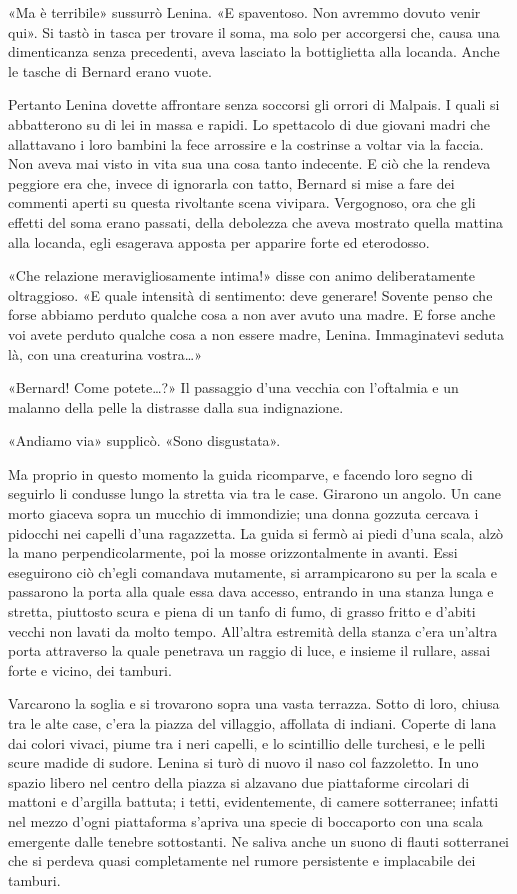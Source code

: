 \documentclass[
a5paper, %
10pt, %
twoside, 
onecolumn, %
openany, %
]{memoir}
\begin{document}
«Ma è terribile» sussurrò Lenina. «E spaventoso. Non avremmo dovuto venir qui». Si tastò in tasca per trovare il soma, ma solo per accorgersi che, causa una dimenticanza senza precedenti, aveva lasciato la bottiglietta alla locanda. Anche le tasche di Bernard erano vuote.

Pertanto Lenina dovette affrontare senza soccorsi gli orrori di Malpais. I quali si abbatterono su di lei in massa e rapidi. Lo spettacolo di due giovani madri che allattavano i loro bambini la fece arrossire e la costrinse a voltar via la faccia. Non aveva mai visto in vita sua una cosa tanto indecente. E ciò che la rendeva peggiore era che, invece di ignorarla con tatto, Bernard si mise a fare dei commenti aperti su questa rivoltante scena vivipara. Vergognoso, ora che gli effetti del soma erano passati, della debolezza che aveva mostrato quella mattina alla locanda, egli esagerava apposta per apparire forte ed eterodosso.

«Che relazione meravigliosamente intima!» disse con animo deliberatamente oltraggioso. «E quale intensità di sentimento: deve generare! Sovente penso che forse abbiamo perduto qualche cosa a non aver avuto una madre. E forse anche voi avete perduto qualche cosa a non essere madre, Lenina. Immaginatevi seduta là, con una creaturina vostra…»

«Bernard! Come potete…?» Il passaggio d’una vecchia con l’oftalmia e un malanno della pelle la distrasse dalla sua indignazione.

«Andiamo via» supplicò. «Sono disgustata».

Ma proprio in questo momento la guida ricomparve, e facendo loro segno di seguirlo li condusse lungo la stretta via tra le case. Girarono un angolo. Un cane morto giaceva sopra un mucchio di immondizie; una donna gozzuta cercava i pidocchi nei capelli d’una ragazzetta. La guida si fermò ai piedi d’una scala, alzò la mano perpendicolarmente, poi la mosse orizzontalmente in avanti. Essi eseguirono ciò ch’egli comandava mutamente, si arrampicarono su per la scala e passarono la porta alla quale essa dava accesso, entrando in una stanza lunga e stretta, piuttosto scura e piena di un tanfo di fumo, di grasso fritto e d’abiti vecchi non lavati da molto tempo. All’altra estremità della stanza c’era un’altra porta attraverso la quale penetrava un raggio di luce, e insieme il rullare, assai forte e vicino, dei tamburi.

Varcarono la soglia e si trovarono sopra una vasta terrazza. Sotto di loro, chiusa tra le alte case, c’era la piazza del villaggio, affollata di indiani. Coperte di lana dai colori vivaci, piume tra i neri capelli, e lo scintillio delle turchesi, e le pelli scure madide di sudore. Lenina si turò di nuovo il naso col fazzoletto. In uno spazio libero nel centro della piazza si alzavano due piattaforme circolari di mattoni e d’argilla battuta; i tetti, evidentemente, di camere sotterranee; infatti nel mezzo d’ogni piattaforma s’apriva una specie di boccaporto con una scala emergente dalle tenebre sottostanti. Ne saliva anche un suono di flauti sotterranei che si perdeva quasi completamente nel rumore persistente e implacabile dei tamburi.
\end{document}
